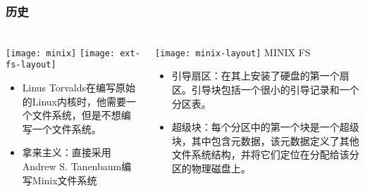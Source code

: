 \begin{frame}[fragile]
	\frametitle{历史}
	
	\frametitle{ }
	\begin{columns}[t]
		\begin{column}{.4\textwidth}
			\texttt{[image: minix]}
			\texttt{[image: ext-fs-layout]}
	
			\begin{itemize}
				\item Linus Torvalds在编写原始的Linux内核时，他需要一个文件系统，但是不想编写一个文件系统。
				\item 拿来主义：直接采用Andrew S. Tanenbaum编写Minix文件系统
			\end{itemize}
		
		\end{column}
		
		\begin{column}{.6\textwidth}			
			\texttt{[image: minix-layout]}
			MINIX FS
				\begin{itemize}
					\item 引导扇区：在其上安装了硬盘的第一个扇区。引导块包括一个很小的引导记录和一个分区表。
					\item 超级块：每个分区中的第一个块是一个超级块，其中包含元数据，该元数据定义了其他文件系统结构，并将它们定位在分配给该分区的物理磁盘上。
				\end{itemize}
			
		\end{column}
	\end{columns}
	
\end{frame}

